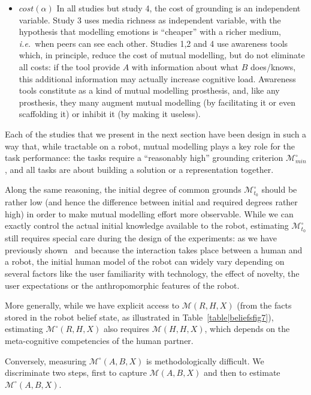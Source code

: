 \documentclass[twocolumn]{article}
\newcommand{\ie}{{\textit{i.e.\ }}}
\newcommand{\model}[3]{{$\mathcal{M}(#1, #2, #3)$}}
\newcommand{\Model}[3]{{$\mathcal{M}^{\circ}(#1, #2, #3)$}}
\newcommand{\groundingcriterion}{{$\mathcal{M}^{\circ}_{min}$}}
\newcommand{\inigrounding}{{$\mathcal{M}^{\circ}_{t_0}$}}
\begin{document}
\begin{itemize}
    \item $cost(\alpha)$ In all studies but study 4, the cost of  grounding is
        an independent variable. Study 3 uses media richness as independent
        variable, with the hypothesis that modelling emotions is ``cheaper'' with a
        richer medium, \ie  when peers can see each other.  Studies 1,2 and 4
        use awareness tools which, in principle, reduce the cost of mutual modelling, but do
        not eliminate all costs: if the tool provide $A$ with information about
        what $B$ does/knows, this additional information may actually increase
        cognitive load. Awareness tools constitute as a kind of mutual modelling prosthesis,
        and, like any prosthesis, they many augment mutual modelling (by facilitating it or
        even scaffolding it) or inhibit it (by making it useless).

\end{itemize}


Each of the studies that we present in the next section have been design in such
a way that, while tractable on a robot, mutual modelling plays a key role for
the task performance: the tasks require a ``reasonably high'' grounding
criterion \groundingcriterion, and all tasks are about building a solution or a
representation together.

Along the same reasoning, the initial degree of common grounds \inigrounding
should be rather low (and hence the difference between initial and required
degrees rather high) in order to make mutual modelling effort more observable.
While we can exactly control the actual initial knowledge available to the
robot, estimating \inigrounding still requires special care during the design of
the experiments: as we have previously shown~\citep{lemaignan2014dynamics,
lemaignan2014cognitive} and because the interaction takes place between a human and
a robot, the initial human model of the robot can widely vary depending on
several factors like the user familiarity with technology, the effect of
novelty, the user expectations or the anthropomorphic features of the robot.

More generally, while we have explicit access to \model{R}{H}{X} (from the facts
stored in the robot belief state, as illustrated in
Table~\ref{table|beliefsfig7}), estimating \Model{R}{H}{X} also requires
\model{H}{H}{X}, which depends on the meta-cognitive competencies of the human
partner.

Conversely, measuring \Model{A}{B}{X} is methodologically difficult. We
discriminate two steps, first to capture \model{A}{B}{X} and then to
estimate \Model{A}{B}{X}. 
\end{document}
